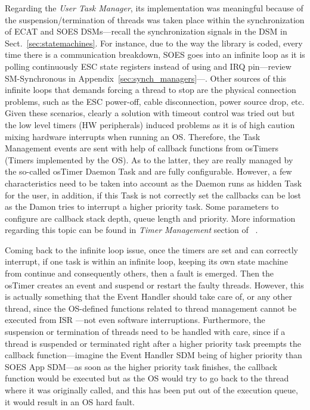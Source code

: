 Regarding the \emph{User Task Manager}, its implementation was meaningful because of the suspension/termination of threads was taken place
within the synchronization of ECAT and SOES DSMs---recall the synchronization signals in the DSM in Sect.~\ref{sec:statemachines}. 
For instance, due to the way the library is coded, every time there is a communication breakdown, SOES goes into an infinite loop 
as it is polling continuously ESC state registers instead of using and IRQ pin---review SM-Synchronous in Appendix~\ref{sec:synch_managers}---. 
Other sources of this infinite loops that demands forcing a thread to stop are the physical connection problems, such as the ESC power-off, 
cable disconnection, power source drop, etc. 
Given these scenarios, clearly a solution with timeout control was tried out but the low level timers (HW peripherals) induced problems
as it is of high caution mixing hardware interrupts when running an OS.
Therefore, the Task Management events are sent with help of callback functions from osTimers (Timers implemented by the OS). 
As to the latter, they are really managed by the so-called osTimer Daemon Task and are fully configurable. However, a few characteristics need to be taken 
into account as the Daemon runs as hidden Task for the user, in addition, if this Task is not correctly set the callbacks can be lost 
as the Damon tries to interrupt a higher priority task. Some parameters to configure are callback stack depth, queue length and priority. 
More information regarding this topic can be found in \emph{Timer Management} section of ~\cite{cmsis_doc}.

Coming back to the infinite loop issue, once the timers are set and can correctly interrupt, if one task is within an infinite loop, keeping its own 
state machine from continue and consequently others, then a fault is emerged. Then the osTimer creates an event and suspend or restart the faulty threads.
However, this is actually something that the Event Handler should take care of, or any other thread, since the OS-defined functions
related to thread management cannot be executed from ISR ---not even software interruptions. Furthermore, the suspension or termination of
threads need to be handled with care, since if a thread is suspended or terminated right after a higher priority task preempts the callback
function---imagine the Event Handler SDM being of higher priority than SOES App SDM---as soon as the higher priority task finishes, the callback 
function would be executed but as the OS would try to
go back to the thread where it was originally called, and this has been put out of the execution queue, it would result in an OS hard fault.

